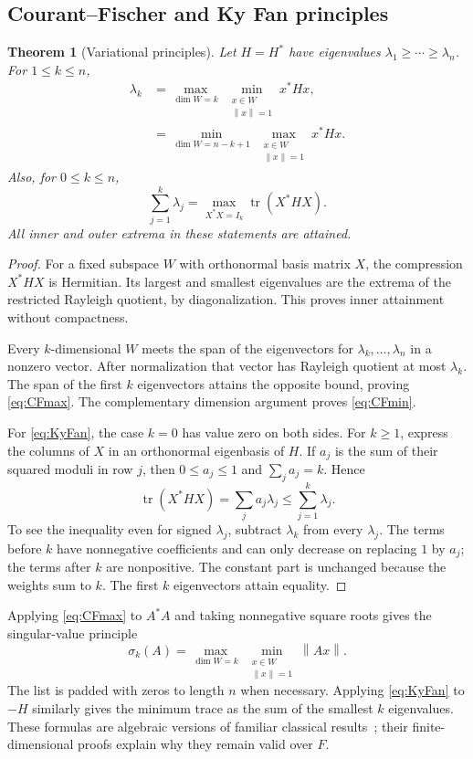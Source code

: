 \documentclass[11pt,a4paper]{article}
\numberwithin{equation}{section}
\newtheorem{theorem}{Theorem}[section]
\theoremstyle{definition}
\theoremstyle{remark}
\newcommand{\tr}{\operatorname{tr}}
\newcommand{\norm}[1]{\left\lVert#1\right\rVert}
\begin{document}
\subsection{Courant--Fischer and Ky Fan principles}
\begin{theorem}[Variational principles]\label{thm:minmax}
Let $H=H^*$ have eigenvalues $\lambda_1\ge\cdots\ge\lambda_n$. For
$1\le k\le n$,
\begin{align}
 \lambda_k
 &=\max_{\dim W=k}\ \min_{\substack{x\in W\\\norm x=1}}x^*Hx,
 \label{eq:CFmax}\\
 &=\min_{\dim W=n-k+1}\ \max_{\substack{x\in W\\\norm x=1}}x^*Hx.
 \label{eq:CFmin}
\end{align}
Also, for $0\le k\le n$,
\begin{equation}\label{eq:KyFan}
 \sum_{j=1}^k\lambda_j
 =\max_{X^*X=I_k}\tr(X^*HX).
\end{equation}
All inner and outer extrema in these statements are attained.
\end{theorem}
\begin{proof}
For a fixed subspace $W$ with orthonormal basis matrix $X$, the compression
$X^*HX$ is Hermitian. Its largest and smallest eigenvalues are the extrema
of the restricted Rayleigh quotient, by diagonalization. This proves inner
attainment without compactness.

Every $k$-dimensional $W$ meets the span of the eigenvectors for
$\lambda_k,\ldots,\lambda_n$ in a nonzero vector. After normalization that
vector has Rayleigh quotient at most $\lambda_k$. The span of the first
$k$ eigenvectors attains the opposite bound, proving \eqref{eq:CFmax}.
The complementary dimension argument proves \eqref{eq:CFmin}.

For \eqref{eq:KyFan}, the case $k=0$ has value zero on both sides. For
$k\ge1$, express the columns of $X$ in an orthonormal eigenbasis
of $H$. If $a_j$ is the sum of their squared moduli in row $j$, then
$0\le a_j\le1$ and $\sum_j a_j=k$. Hence
\[
 \tr(X^*HX)=\sum_j a_j\lambda_j\le\sum_{j=1}^k\lambda_j.
\]
To see the inequality even for signed $\lambda_j$, subtract $\lambda_k$
from every $\lambda_j$. The terms before $k$ have nonnegative coefficients
and can only decrease on replacing $1$ by $a_j$; the terms after $k$ are
nonpositive. The constant part is unchanged because the weights sum to
$k$. The first $k$ eigenvectors attain equality.
\end{proof}

Applying \eqref{eq:CFmax} to $A^*A$ and taking nonnegative square roots
gives the singular-value principle
\begin{equation}\label{eq:singminmax}
 \sigma_k(A)=\max_{\dim W=k}\ \min_{\substack{x\in W\\\norm x=1}}\norm{Ax}.
\end{equation}
The list is padded with zeros to length $n$ when necessary. Applying
\eqref{eq:KyFan} to $-H$ similarly gives the minimum trace as the sum of the
smallest $k$ eigenvalues. These formulas are algebraic versions of familiar
classical results~\cite{Tao}; their finite-dimensional proofs explain why
they remain valid over $F$.
\end{document}

